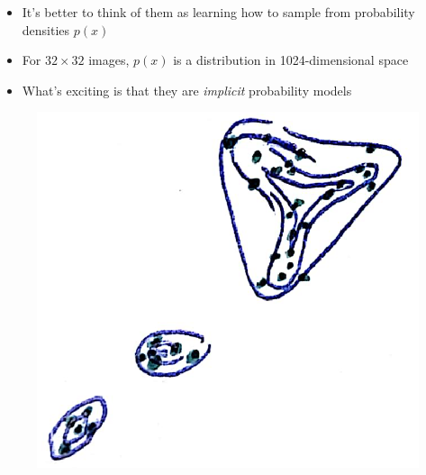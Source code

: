 \documentclass[10pt,mathserif]{beamer}
\begin{document}
\begin{frame}
\begin{itemize}
\item It's better to think of them as learning how to sample from probability
  densities $p\left(x\right)$
\item For $32 \times 32$ images, $p\left(x\right)$ is a distribution in
  1024-dimensional space
\item What's exciting is that they are \textit{implicit} probability models
\end{itemize}
\begin{figure}[ht]
  \centering
  \includegraphics[width=0.7\paperwidth]{figure/gan_density}
  \caption{\label{fig:gan_density} }
\end{figure}
\end{frame}
\end{document}
